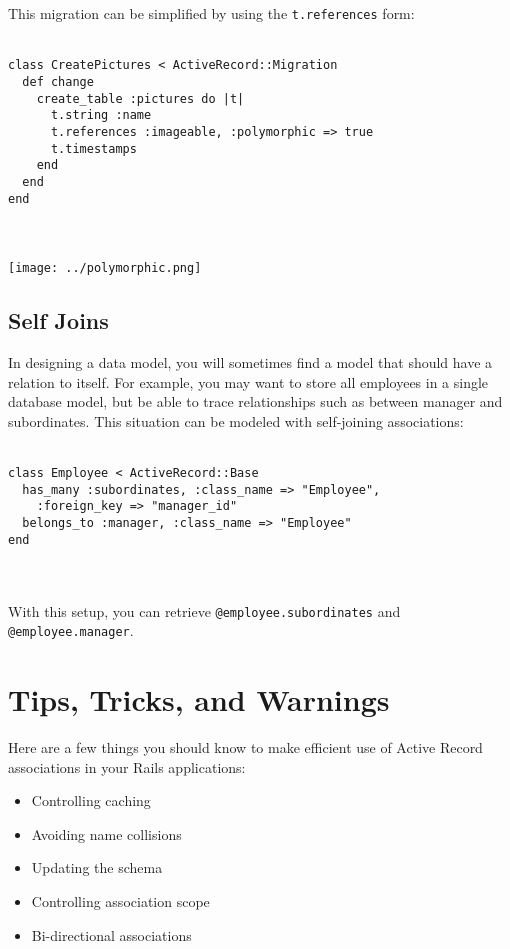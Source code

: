 \documentclass[10pt]{book}
\begin{document}
This migration can be simplified by using the \texttt{t.references} form:
\\ \\
\begin{minipage}{\textwidth}{\scriptsize
\begin{verbatim}
class CreatePictures < ActiveRecord::Migration
  def change
    create_table :pictures do |t|
      t.string :name
      t.references :imageable, :polymorphic => true
      t.timestamps
    end
  end
end
\end{verbatim}}
\end{minipage}
\\ \\


\texttt{[image: ../polymorphic.png]}

\subsection{ Self Joins}

In designing a data model, you will sometimes find a model that  should have a relation to itself. For example, you may want to store all  employees in a single database model, but be able to trace  relationships such as between manager and subordinates. This situation  can be modeled with self-joining associations:
\\ \\
\begin{minipage}{\textwidth}{\scriptsize
\begin{verbatim}
class Employee < ActiveRecord::Base
  has_many :subordinates, :class_name => "Employee",
    :foreign_key => "manager_id"
  belongs_to :manager, :class_name => "Employee"
end
\end{verbatim}}
\end{minipage}
\\ \\

With this setup, you can retrieve \texttt{@employee.subordinates} and \texttt{@employee.manager}.

\section{ Tips, Tricks, and Warnings}

Here are a few things you should know to make efficient use of Active Record associations in your Rails applications:
\begin{itemize}
	\item Controlling caching
	\item Avoiding name collisions
	\item Updating the schema
	\item Controlling association scope
	\item Bi-directional associations
\end{itemize}
\end{document}
